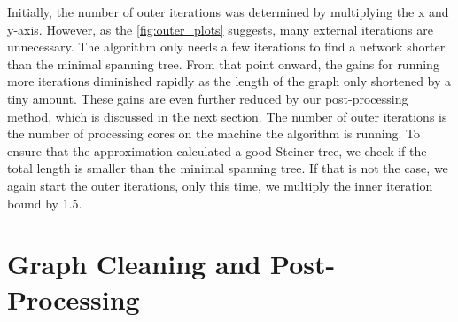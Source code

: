 Initially, the number of outer iterations was determined by multiplying the x and y-axis. However, as the \autoref{fig:outer_plots} suggests, many external iterations are unnecessary. The algorithm only needs a few iterations to find a network shorter than the minimal spanning tree. From that point onward, the gains for running more iterations diminished rapidly as the length of the graph only shortened by a tiny amount. These gains are even further reduced by our post-processing method, which is discussed in the next section.
The number of outer iterations is the number of processing cores on the machine the algorithm is running. To ensure that the approximation calculated a good Steiner tree, we check if the total length is smaller than the minimal spanning tree. If that is not the case, we again start the outer iterations, only this time, we multiply the inner iteration bound by 1.5.

\section{Graph Cleaning and Post-Processing}
\label{sec:cleaning_and_processing}

